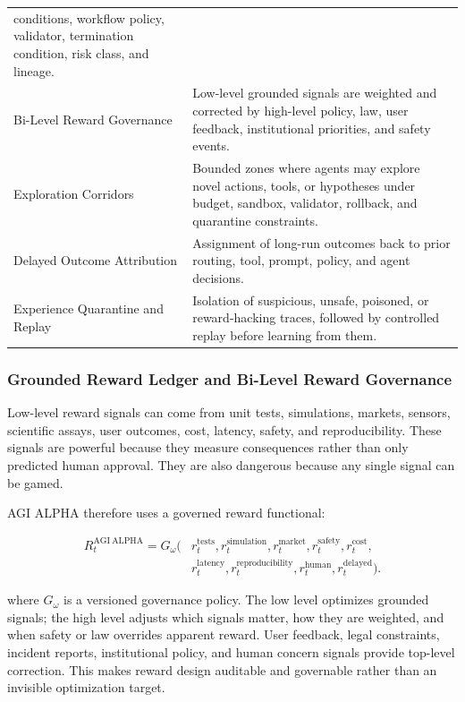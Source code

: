\begin{longtable}[]{@{}
  >{\raggedright\arraybackslash}p{}
  >{\raggedright\arraybackslash}p{}@{}}
conditions, workflow policy, validator, termination condition, risk
class, and lineage. \\
Bi-Level Reward Governance & Low-level grounded signals are weighted and
corrected by high-level policy, law, user feedback, institutional
priorities, and safety events. \\
Exploration Corridors & Bounded zones where agents may explore novel
actions, tools, or hypotheses under budget, sandbox, validator,
rollback, and quarantine constraints. \\
Delayed Outcome Attribution & Assignment of long-run outcomes back to
prior routing, tool, prompt, policy, and agent decisions. \\
Experience Quarantine and Replay & Isolation of suspicious, unsafe,
poisoned, or reward-hacking traces, followed by controlled replay before
learning from them. \\
\end{longtable}

\subsubsection{Grounded Reward Ledger and Bi-Level Reward
Governance}\label{grounded-reward-ledger-and-bi-level-reward-governance}

Low-level reward signals can come from unit tests, simulations, markets,
sensors, scientific assays, user outcomes, cost, latency, safety, and
reproducibility. These signals are powerful because they measure
consequences rather than only predicted human approval. They are also
dangerous because any single signal can be gamed.

AGI ALPHA therefore uses a governed reward functional:

\[
\begin{aligned}
R_t^{\mathrm{AGI\ ALPHA}}=G_\omega\big(&r_t^{\mathrm{tests}},r_t^{\mathrm{simulation}},r_t^{\mathrm{market}},
 r_t^{\mathrm{safety}},r_t^{\mathrm{cost}},\\
&r_t^{\mathrm{latency}},r_t^{\mathrm{reproducibility}},r_t^{\mathrm{human}},
 r_t^{\mathrm{delayed}}\big).
\end{aligned}
\]

where \(G_\omega\) is a versioned governance policy. The low level
optimizes grounded signals; the high level adjusts which signals matter,
how they are weighted, and when safety or law overrides apparent reward.
User feedback, legal constraints, incident reports, institutional
policy, and human concern signals provide top-level correction. This
makes reward design auditable and governable rather than an invisible
optimization target.

